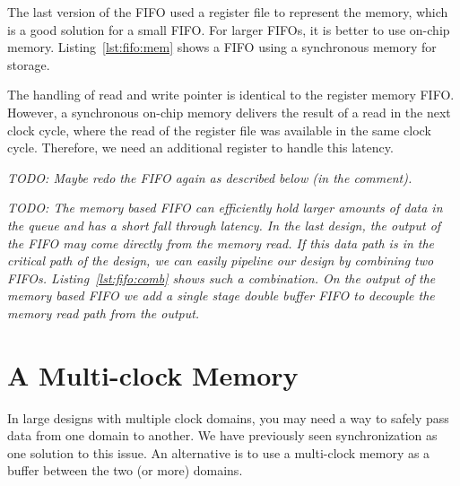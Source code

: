 \documentclass[%
    10pt,
    headinclude, footexclude,
    openright, %
    notitlepage,
    cleardoubleempty,
    headsepline,
    pointlessnumbers,
    bibtotoc, idxtotoc,
    ]{scrbook}
\newcommand{\code}[1]{{\lstinline[basicstyle=\small\ttfamily]{#1}}}
\newcommand{\todo}[1]{{\emph{TODO: #1}}}
\begin{document}
The last version of the FIFO used a register file to represent the memory,
which is a good solution for a small FIFO. For larger FIFOs, it is better to
use on-chip memory.
Listing~\ref{lst:fifo:mem} shows a FIFO using a synchronous memory for
storage.

\newpage
{}

The handling of read and write pointer is identical to the register memory
FIFO. However, a synchronous on-chip memory delivers the result of a read
in the next clock cycle, where the read of the register file was available in the
same clock cycle.
Therefore, we need an additional register to handle this latency.

\todo{Maybe redo the FIFO again as described below (in the comment).}

\todo{
The memory based FIFO can efficiently hold larger amounts of data in the queue
and has a short fall through latency. In the last design, the output of the FIFO may
come directly from the memory read. If this data path is in the critical path of the design,
we can easily pipeline our design by combining two FIFOs. Listing~\ref{lst:fifo:comb}
shows such a combination. On the output of the memory based FIFO we add a single
stage double buffer FIFO to decouple the memory read path from the output.}


\section{A Multi-clock Memory}

In large designs with multiple clock domains, you may need a way to safely
pass data from one domain to another. We have previously seen synchronization as
one solution to this issue. An alternative is to use a multi-clock memory as
a buffer between the two (or more) domains.
\end{document}
